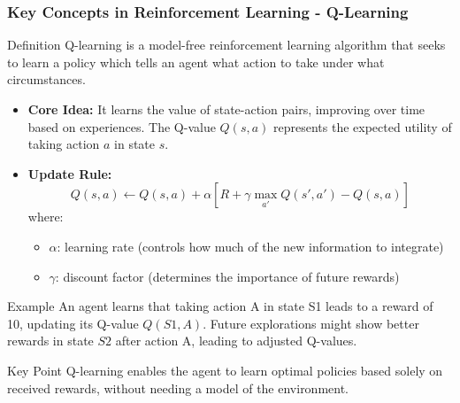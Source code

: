 \documentclass[aspectratio=169]{beamer}
\begin{document}
\begin{frame}[fragile]
    \frametitle{Key Concepts in Reinforcement Learning - Q-Learning}
    \begin{block}{Definition}
        Q-learning is a model-free reinforcement learning algorithm that seeks to learn a policy which tells an agent what action to take under what circumstances.
    \end{block}
    \begin{itemize}
        \item \textbf{Core Idea:} It learns the value of state-action pairs, improving over time based on experiences. The Q-value \( Q(s, a) \) represents the expected utility of taking action \( a \) in state \( s \).
        \item \textbf{Update Rule:}
        \[
        Q(s, a) \leftarrow Q(s, a) + \alpha \left[R + \gamma \max_{a'} Q(s', a') - Q(s, a)\right]
        \]
        where:
        \begin{itemize}
            \item \( \alpha \): learning rate (controls how much of the new information to integrate)
            \item \( \gamma \): discount factor (determines the importance of future rewards)
        \end{itemize}
    \end{itemize}
    \begin{block}{Example}
        An agent learns that taking action A in state S1 leads to a reward of 10, updating its Q-value \( Q(S1, A) \). Future explorations might show better rewards in state \( S2 \) after action A, leading to adjusted Q-values.
    \end{block}
    \begin{block}{Key Point}
        Q-learning enables the agent to learn optimal policies based solely on received rewards, without needing a model of the environment.
    \end{block}
\end{frame}
\end{document}
